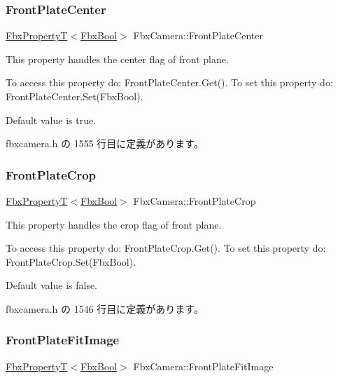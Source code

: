 \subsubsection{\texorpdfstring{Front\+Plate\+Center}{FrontPlateCenter}}
{\footnotesize\ttfamily \hyperlink{class_fbx_property_t}{Fbx\+PropertyT}$<$\hyperlink{fbxtypes_8h_a92e0562b2fe33e76a242f498b362262e}{Fbx\+Bool}$>$ Fbx\+Camera\+::\+Front\+Plate\+Center}

This property handles the center flag of front plane.

To access this property do\+: Front\+Plate\+Center.\+Get(). To set this property do\+: Front\+Plate\+Center.\+Set(\+Fbx\+Bool).

Default value is true. 

 fbxcamera.\+h の 1555 行目に定義があります。

\mbox{\label{class_fbx_camera_af409f4d6dd0b68de9a3e0c2f17644362}} 
\subsubsection{\texorpdfstring{Front\+Plate\+Crop}{FrontPlateCrop}}
{\footnotesize\ttfamily \hyperlink{class_fbx_property_t}{Fbx\+PropertyT}$<$\hyperlink{fbxtypes_8h_a92e0562b2fe33e76a242f498b362262e}{Fbx\+Bool}$>$ Fbx\+Camera\+::\+Front\+Plate\+Crop}

This property handles the crop flag of front plane.

To access this property do\+: Front\+Plate\+Crop.\+Get(). To set this property do\+: Front\+Plate\+Crop.\+Set(\+Fbx\+Bool).

Default value is false. 

 fbxcamera.\+h の 1546 行目に定義があります。

\mbox{\label{class_fbx_camera_a98c919c1ec1398479c859357d3f454d7}} 
\subsubsection{\texorpdfstring{Front\+Plate\+Fit\+Image}{FrontPlateFitImage}}
{\footnotesize\ttfamily \hyperlink{class_fbx_property_t}{Fbx\+PropertyT}$<$\hyperlink{fbxtypes_8h_a92e0562b2fe33e76a242f498b362262e}{Fbx\+Bool}$>$ Fbx\+Camera\+::\+Front\+Plate\+Fit\+Image}

